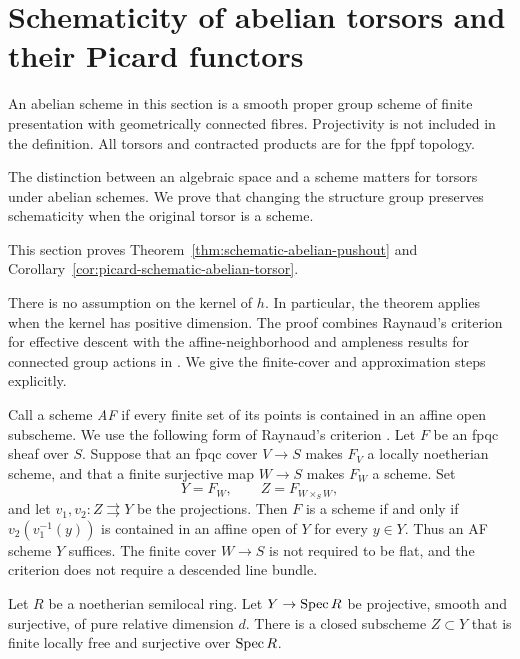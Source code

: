 \section{Schematicity of abelian torsors and their Picard functors}
\label{sec:abelian-torsor-schemes}

An abelian scheme in this section is a smooth proper group scheme of
finite presentation with geometrically connected fibres. Projectivity is
not included in the definition. All torsors and contracted products are
for the fppf topology.

The distinction between an algebraic space and a scheme matters for
torsors under abelian schemes. We prove that changing the structure group
preserves schematicity when the original torsor is a scheme.

This section proves Theorem~\ref{thm:schematic-abelian-pushout} and Corollary~\ref{cor:picard-schematic-abelian-torsor}.

There is no assumption on the kernel of $h$. In particular, the theorem
applies when the kernel has positive dimension. The proof combines
Raynaud's criterion for effective descent with the affine-neighborhood
and ampleness results for connected group actions in
\cite[\S6.6, Theorem~2(c),(d), pp.~164--166]{BLR}.
We give the finite-cover and approximation steps explicitly.

Call a scheme \emph{AF} if every finite set of its points is contained
in an affine open subscheme. We use the following form of Raynaud's
criterion \cite[Theorem~4.2, pp.~5-16--5-18]{RaynaudDescent}.
Let $F$ be an fpqc sheaf over $S$. Suppose that an fpqc cover $V\to S$
makes $F_V$ a locally noetherian scheme, and that a finite surjective
map $W\to S$ makes $F_W$ a scheme. Set
\[
 Y=F_W,\qquad Z=F_{W\times_S W},
\]
and let $v_1,v_2:Z\rightrightarrows Y$ be the projections.
Then $F$ is a scheme if and only if
$v_2(v_1^{-1}(y))$ is contained in an affine open of $Y$ for every
$y\in Y$. Thus an AF scheme $Y$ suffices. The finite cover $W\to S$
is not required to be flat, and the criterion does not require a
descended line bundle.

\begin{lemma}\label{lem:semilocal-multisection}
Let $R$ be a noetherian semilocal ring. Let $Y\to\operatorname{Spec} R$ be projective,
smooth and surjective, of pure relative dimension $d$.
There is a closed subscheme $Z\subset Y$ that is finite locally free
and surjective over $\operatorname{Spec} R$.
\end{lemma}

